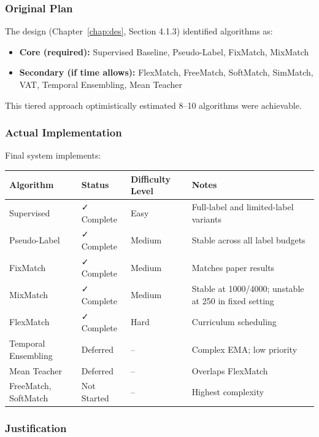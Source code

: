 \subsubsection{Original Plan}

The design (Chapter~\ref{chap:des}, Section 4.1.3) identified algorithms as:
\begin{itemize}
    \item \textbf{Core (required):} Supervised Baseline, Pseudo-Label, FixMatch, MixMatch
    \item \textbf{Secondary (if time allows):} FlexMatch, FreeMatch, SoftMatch, SimMatch, VAT, Temporal Ensembling, Mean Teacher
\end{itemize}

This tiered approach optimistically estimated 8--10 algorithms were achievable.

\subsubsection{Actual Implementation}

Final system implements:

\begin{center}
\small
\begin{tabular}{|l|l|l|l|}
\hline
\textbf{Algorithm} & \textbf{Status} & \textbf{Difficulty Level} & \textbf{Notes} \\
\hline
Supervised & ✓ Complete & Easy & Full-label and limited-label variants \\
Pseudo-Label & ✓ Complete & Medium & Stable across all label budgets \\
FixMatch & ✓ Complete & Medium & Matches paper results \\
MixMatch & ✓ Complete & Medium & Stable at 1000/4000; unstable at 250 in fixed setting \\
FlexMatch & ✓ Complete & Hard & Curriculum scheduling \\
Temporal Ensembling & Deferred & -- & Complex EMA; low priority \\
Mean Teacher & Deferred & -- & Overlaps FlexMatch \\
FreeMatch, SoftMatch & Not Started & -- & Highest complexity \\
\hline
\end{tabular}
\end{center}

\subsubsection{Justification}

